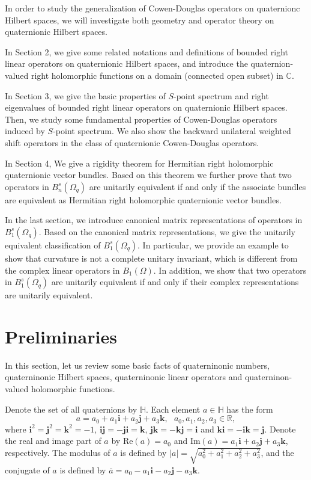 \documentclass[pdflatex,sn-mathphys-num]{sn-jnl}%
\theoremstyle{thmstyleone}%
\theoremstyle{thmstyletwo}%
\theoremstyle{thmstylethree}%
\theoremstyle{definition}
\theoremstyle{remark}
\begin{document}
In order to study the generalization of Cowen-Douglas operators on quaternionc Hilbert spaces, we will investigate both geometry and operator theory on quaternionic Hilbert spaces.

In Section 2, we give some related notations and definitions of bounded right linear operators on quaternionic Hilbert spaces, and introduce the quaternion-valued right holomorphic functions on a domain (connected open subset) in $\mathbb{C}$.

In Section 3, we give the basic properties of $S$-point spectrum and right eigenvalues of bounded right linear operators on quaternionic Hilbert spaces. Then, we study some fundamental properties of Cowen-Douglas operators induced by $S$-point spectrum. We also show the backward unilateral weighted shift operators in the class of quaternionic Cowen-Douglas operators.

In Section 4, We give a rigidity theorem for Hermitian right holomorphic quaternionic vector bundles. Based on this theorem we further prove that two operators in $B_n^{s}(\Omega_q)$ are unitarily equivalent if and only if the associate bundles are equivalent as Hermitian right holomorphic quaternionic vector bundles.

In the last section, we introduce canonical matrix representations of operators in $B_1^{s}(\Omega_q)$. Based on the canonical matrix representations, we give the unitarily equivalent classification of $B_1^{s}(\Omega_q)$. In particular, we provide an example to show that curvature is not a complete unitary invariant,  which is different from the complex linear operators in $B_1(\Omega)$. In addition, we show that two  operators in $B_1^{s}(\Omega_q)$ are unitarily equivalent if and only if their complex representations are unitarily equivalent.

\section{Preliminaries}\label{sec2}

In this section, let us review some basic facts of quaterninonic numbers, quaterninonic Hilbert spaces, quaterninonic linear operators and quaterninon-valued holomorphic functions.

Denote the set of all quaternions by $\mathbb{H}$. Each element $a\in\mathbb{H}$ has the form
\[
a=a_0+a_1\boldsymbol{i}+a_2\boldsymbol{j}+a_3\boldsymbol{k},\ \ \ a_0, a_1, a_2, a_3\in\mathbb{R},
\]
where $\boldsymbol{i}^2=\boldsymbol{j}^2=\boldsymbol{k}^2=-1$, $\boldsymbol{i}\boldsymbol{j}=-\boldsymbol{j}\boldsymbol{i}=\boldsymbol{k}$,
$\boldsymbol{j}\boldsymbol{k}=-\boldsymbol{k}\boldsymbol{j}=\boldsymbol{i}$ and
$\boldsymbol{k}\boldsymbol{i}=-\boldsymbol{i}\boldsymbol{k}=\boldsymbol{j}$. Denote the real and image part of $a$  by $\mathrm{Re}(a)=a_0$ and $\mathrm{Im}(a)=a_1\boldsymbol{i}+a_2\boldsymbol{j}+a_3\boldsymbol{k}$, respectively. The modulus of $a$ is defined by
$|a|=\sqrt{a_0^2+a_1^2+a_2^2+a_3^2}$, and the conjugate of $a$ is defined by $\overline{a}=a_0-a_1\boldsymbol{i}-a_2\boldsymbol{j}-a_3\boldsymbol{k}$.
\end{document}

